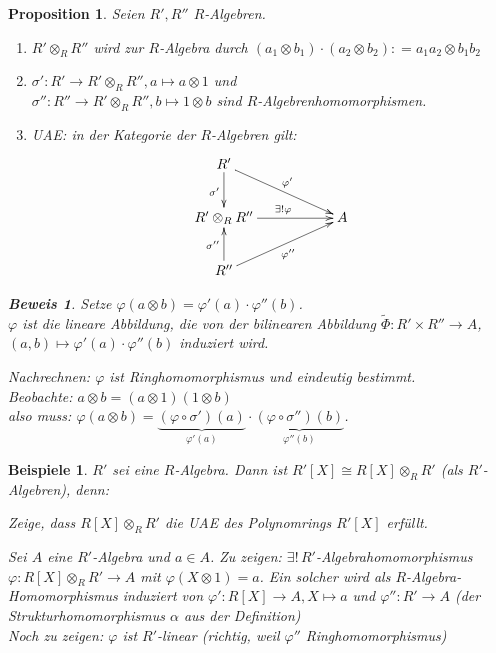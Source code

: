 \documentclass[a4paper,12pt]{scrbook}
\theoremstyle{break}
\newtheorem{Prop}[Def]{Proposition}
\theoremstyle{nonumberbreak}
\newtheorem{Bew}{Beweis}
\newtheorem{nnBsp}{Beispiele}
\theoremstyle{nonumberplain}
\newcommand{\defeqr}[0]{\mathrel{\mathop:}=}
\begin{document}
\begin{Prop}
  \label{1.16}
  Seien $R', R''$ $R$-Algebren.
  \begin{enumerate}
  \item $R'\otimes_R R''$ wird zur $R$-Algebra durch $(a_1\otimes b_1)\cdot (a_2 \otimes b_2)\defeqr a_1a_2\otimes b_1 b_2$
  \item $\sigma': R'\to R'\otimes_R R'', a\mapsto a\otimes 1$ und \\
    $\sigma'': R''\to R'\otimes_R R'', b\mapsto 1\otimes b$
    sind $R$-Algebrenhomomorphismen.
  \item UAE: in der Kategorie der $R$-Algebren gilt:
    \[
    \begin{xy}
      \xymatrix{
        R' \ar[d]_{\sigma'} \ar[drr]^{\varphi'}    & & \\
        R' \otimes_R R'' \ar[rr]^{\exists!\varphi} & & A \\
        R'' \ar[u]^{\sigma''} \ar[urr]_{\varphi''} & &
      }
    \end{xy}
    \]
  \end{enumerate}

  \begin{Bew}
    Setze $\varphi(a \otimes b) = \varphi'(a) \cdot \varphi''(b)$.\\
    $\varphi$ ist die lineare Abbildung, die von der bilinearen Abbildung $\tilde{\Phi} : R' \times R'' \rightarrow A$, $(a, b) \mapsto \varphi'(a) \cdot \varphi''(b)$ induziert wird.

    Nachrechnen: $\varphi$ ist Ringhomomorphismus und eindeutig bestimmt.\\
    Beobachte: $a \otimes b = (a \otimes 1)(1 \otimes b)$\\
    also muss: $\varphi(a \otimes b) = \underbrace{(\varphi \circ \sigma')(a)}_{\varphi'(a)} \cdot \underbrace{(\varphi \circ \sigma'')(b)}_{\varphi''(b)}$.
  \end{Bew}

\end{Prop}

\begin{nnBsp}
$R'$ sei eine $R$-Algebra. Dann ist $R'[X] \cong R[X] \otimes_R R'$ (als $R'$-Algebren), denn:

Zeige, dass $R[X] \otimes_R R'$ die UAE des Polynomrings $R'[X]$ erfüllt.

Sei $A$ eine $R'$-Algebra und $a \in A$. Zu zeigen: $\exists!\, R'$-Algebrahomomorphismus $\varphi: R[X] \otimes_R R' \rightarrow A$ mit
$\varphi(X \otimes 1 ) = a$. Ein solcher wird als $R$-Algebra-Homomorphismus induziert von $\varphi': R[X] \rightarrow A, X \mapsto a$
und $\varphi'': R' \rightarrow A$ (der Strukturhomomorphismus $\alpha$ aus der Definition)\\
Noch zu zeigen: $\varphi$ ist $R'$-linear (richtig, weil $\varphi''$ Ringhomomorphismus)
\end{nnBsp}
\end{document}
